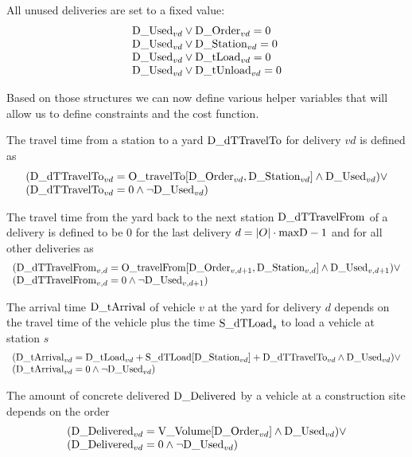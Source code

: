 \documentclass[a4paper]{article}
\newcommand{\OtravelTo}{\text{O\_travelTo}}
\newcommand{\OtravelFrom}{\text{O\_travelFrom}}
\newcommand{\VVolume}{\text{V\_Volume}}
\begin{document}
All unused deliveries are set to a fixed value:
\[
\begin{array}[b]{l}
  \text{D\_Used}_{vd} \vee \text{D\_Order}_{vd} = 0  \\
  \text{D\_Used}_{vd} \vee \text{D\_Station}_{vd} = 0 \\
  \text{D\_Used}_{vd} \vee \text{D\_tLoad}_{vd} = 0 \\
  \text{D\_Used}_{vd} \vee \text{D\_tUnload}_{vd} = 0
\end{array}
\]

\medskip

Based on those structures we can now define various helper variables that will allow us to define constraints and the
cost function.

The travel time from a station to a yard $\text{D\_dTTravelTo}$ for delivery $vd$ is defined as
\[
\begin{array}[b]{l}
(\DdTtravelTo_{vd} = \OtravelTo[\DOrder_{vd}, \DStation_{vd}] \wedge \DUsed_{vd}) \vee \\
(\DdTtravelTo_{vd} = 0 \wedge \neg \DUsed_{vd})
\end{array}
\]

The travel time from the yard back to the next station $\text{D\_dTTravelFrom}$ of a delivery is defined to be 0 for the last
delivery $d = |O| \cdot \text{maxD} - 1$ and for all other deliveries as
\[
\begin{array}[b]{l}
(\DdTtravelFrom_{v,d} = \OtravelFrom[\DOrder_{v,d+1}, \DStation_{v,d}] \wedge \DUsed_{v,d+1}) \vee \\
(\DdTtravelFrom_{v,d} = 0 \wedge \neg \DUsed_{v,d+1})
\end{array}
\]

The arrival time $\text{D\_tArrival}$ of vehicle $v$ at the yard for delivery $d$ depends on the travel time of the vehicle plus
the time $\text{S\_dTLoad}_s$ to load a vehicle at station $s$
\[
\begin{array}[b]{l}
(\text{D\_tArrival}_{vd} = \text{D\_tLoad}_{vd} + \text{S\_dTLoad}[\text{D\_Station}_{vd}] + \text{D\_dTTravelTo}_{vd} \wedge \text{D\_Used}_{vd}) \vee \\
(\text{D\_tArrival}_{vd} = 0 \wedge \neg \text{D\_Used}_{vd})
\end{array}
\]

The amount of concrete delivered $\text{D\_Delivered}$ by a vehicle at a construction site depends on the order
\[
\begin{array}[b]{l}
(\DDelivered_{vd} = \VVolume[\DOrder_{vd}] \wedge \DUsed_{vd}) \vee \\
(\DDelivered_{vd} = 0 \wedge \neg \DUsed_{vd})
\end{array}
\]
\end{document}
